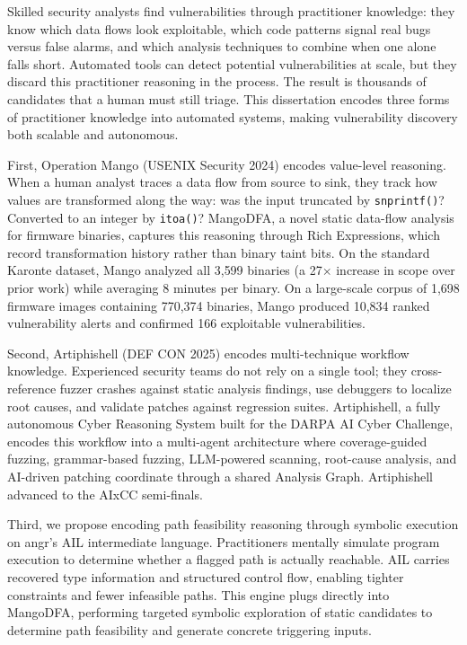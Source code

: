 Skilled security analysts find vulnerabilities through practitioner knowledge: they know which data flows look exploitable, which code patterns signal real bugs versus false alarms, and which analysis techniques to combine when one alone falls short. Automated tools can detect potential vulnerabilities at scale, but they discard this practitioner reasoning in the process. The result is thousands of candidates that a human must still triage. This dissertation encodes three forms of practitioner knowledge into automated systems, making vulnerability discovery both scalable and autonomous.

First, Operation Mango (USENIX Security 2024) encodes value-level reasoning. When a human analyst traces a data flow from source to sink, they track how values are transformed along the way: was the input truncated by \texttt{snprintf()}? Converted to an integer by \texttt{itoa()}? MangoDFA, a novel static data-flow analysis for firmware binaries, captures this reasoning through Rich Expressions, which record transformation history rather than binary taint bits. On the standard Karonte dataset, Mango analyzed all 3,599 binaries (a 27$\times$ increase in scope over prior work) while averaging 8 minutes per binary. On a large-scale corpus of 1,698 firmware images containing 770,374 binaries, Mango produced 10,834 ranked vulnerability alerts and confirmed 166 exploitable vulnerabilities.

Second, Artiphishell (DEF CON 2025) encodes multi-technique workflow knowledge. Experienced security teams do not rely on a single tool; they cross-reference fuzzer crashes against static analysis findings, use debuggers to localize root causes, and validate patches against regression suites. Artiphishell, a fully autonomous Cyber Reasoning System built for the DARPA AI Cyber Challenge, encodes this workflow into a multi-agent architecture where coverage-guided fuzzing, grammar-based fuzzing, LLM-powered scanning, root-cause analysis, and AI-driven patching coordinate through a shared Analysis Graph. Artiphishell advanced to the AIxCC semi-finals.

Third, we propose encoding path feasibility reasoning through symbolic execution on angr's AIL intermediate language. Practitioners mentally simulate program execution to determine whether a flagged path is actually reachable. AIL carries recovered type information and structured control flow, enabling tighter constraints and fewer infeasible paths. This engine plugs directly into MangoDFA, performing targeted symbolic exploration of static candidates to determine path feasibility and generate concrete triggering inputs.
